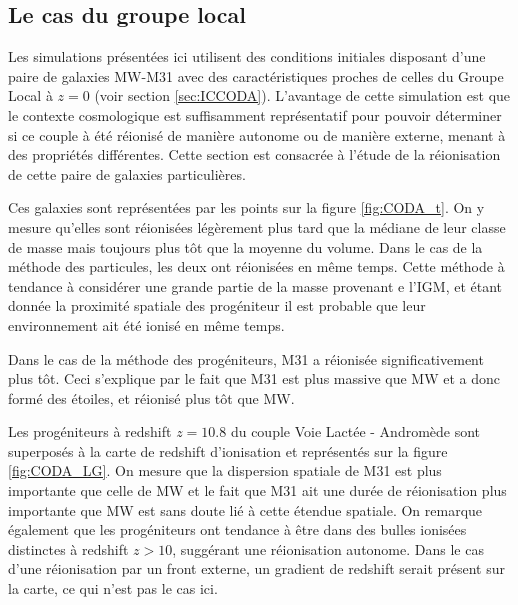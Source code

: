 \subsection{Le cas du groupe local}

Les simulations présentées ici utilisent des conditions initiales disposant d'une paire de galaxies MW-M31 avec des caractéristiques proches de celles du Groupe Local  à $z=0$ (voir section \ref{sec:ICCODA}).
L'avantage de cette simulation est que le contexte cosmologique est suffisamment représentatif pour pouvoir déterminer si ce couple à été réionisé de manière autonome ou de manière externe, menant à des propriétés différentes.
Cette section est consacrée à l'étude de la réionisation de cette paire de galaxies particulières.

Ces galaxies sont représentées par les points sur la figure \ref{fig:CODA_t}. 
On y mesure qu'elles sont réionisées légèrement plus tard que la médiane de leur classe de masse mais toujours plus tôt que la moyenne du volume.
Dans le cas de la méthode des particules, les deux ont réionisées en même temps.
Cette méthode à tendance à considérer une grande partie de la masse provenant e l'\ac{IGM}, et étant donnée la proximité spatiale des progéniteur il est probable que leur environnement ait été ionisé en même temps.

Dans le cas de la méthode des progéniteurs, M31 a réionisée significativement plus tôt.
Ceci s'explique par le fait que M31 est plus massive que MW %
et a donc formé des étoiles, et réionisé plus tôt que MW.



Les progéniteurs à redshift $z=10.8$ du couple Voie Lactée - Andromède sont superposés à la carte de redshift d'ionisation et représentés sur la figure \ref{fig:CODA_LG}.
On mesure que la dispersion spatiale de M31 est plus importante que celle de MW et le fait que M31 ait une durée de réionisation plus importante que MW est sans doute lié à cette étendue spatiale.
On remarque également que les progéniteurs ont tendance à être dans des bulles ionisées distinctes à redshift $z>10$, suggérant une réionisation autonome.
Dans le cas d'une réionisation par un front externe, un gradient de redshift serait présent sur la carte, ce qui n'est pas le cas ici.


